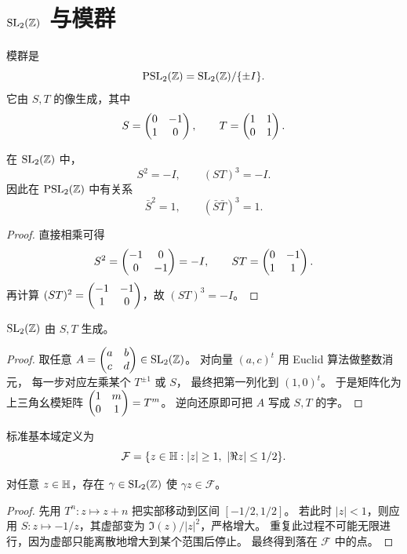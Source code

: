\section{$\mathrm{SL}_2(\mathbb{Z})$ 与模群}
\begin{definition}
模群是
\[
\mathrm{PSL}_2(\mathbb{Z})=\mathrm{SL}_2(\mathbb{Z})/\{\pm I\}.
\]
它由 $S,T$ 的像生成，其中
\[
S=\begin{pmatrix} 0&-1\\1&0 \end{pmatrix},\qquad T=\begin{pmatrix} 1&1\\0&1 \end{pmatrix}.
\]
\end{definition}
\begin{proposition}
在 $\mathrm{SL}_2(\mathbb{Z})$ 中，
\[
S^2=-I,
\qquad (ST)^3=-I.
\]
因此在 $\mathrm{PSL}_2(\mathbb{Z})$ 中有关系
\[
\bar S^2=1,
\qquad (\bar S\bar T)^3=1.
\]
\end{proposition}
\begin{proof}
直接相乘可得
\[
S^2=\begin{pmatrix} -1&0\\0&-1 \end{pmatrix}=-I,
\qquad
ST=\begin{pmatrix} 0&-1\\1&1 \end{pmatrix}.
\]
再计算 $(ST)^2=\begin{pmatrix} -1&-1\\1&0 \end{pmatrix}$，故 $(ST)^3=-I$。
\end{proof}
\begin{theorem}
$\mathrm{SL}_2(\mathbb{Z})$ 由 $S,T$ 生成。
\end{theorem}
\begin{proof}
取任意 $A=\begin{pmatrix} a&b\\c&d \end{pmatrix}\in\mathrm{SL}_2(\mathbb{Z})$。
对向量 $(a,c)^t$ 用 Euclid 算法做整数消元，
每一步对应左乘某个 $T^{\pm1}$ 或 $S$，
最终把第一列化到 $(1,0)^t$。
于是矩阵化为上三角幺模矩阵 $\begin{pmatrix} 1&m\\0&1 \end{pmatrix}=T^m$。
逆向还原即可把 $A$ 写成 $S,T$ 的字。
\end{proof}
\begin{definition}
标准基本域定义为
\[
\mathcal F=\{z\in\mathbb{H}:|z|\ge1,\ |\Re z|\le 1/2\}.
\]
\end{definition}
\begin{proposition}
对任意 $z\in\mathbb{H}$，存在 $\gamma\in\mathrm{SL}_2(\mathbb{Z})$ 使 $\gamma z\in\mathcal F$。
\end{proposition}
\begin{proof}
先用 $T^n:z\mapsto z+n$ 把实部移动到区间 $[-1/2,1/2]$。
若此时 $|z|<1$，则应用 $S:z\mapsto -1/z$，其虚部变为 $\Im(z)/|z|^2$，严格增大。
重复此过程不可能无限进行，因为虚部只能离散地增大到某个范围后停止。
最终得到落在 $\mathcal F$ 中的点。
\end{proof}
